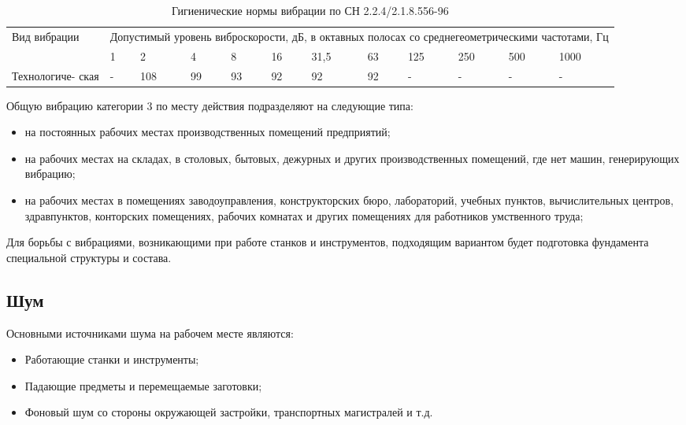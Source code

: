 \begin{table}[!h]
	\begin{center}
		\caption{Гигиенические нормы вибрации по СН 2.2.4/2.1.8.556-96}
		\begin{tabular}{|p{30mm}|
			p{7mm}|
			p{7mm}|
			p{7mm}|
			p{7mm}|
			p{7mm}|
			p{7mm}|
			p{7mm}|
			p{7mm}|
			p{7mm}|
			p{7mm}|
			p{10mm}|
		}
	\hline
	Вид вибрации & \multicolumn{11}{|p{110mm}|}{Допустимый уровень виброскорости, дБ, в октавных полосах со среднегеометрическими частотами, Гц} \\ 
	\cline {2-12}
	& 1 & 2 & 4 & 8 & 16 & 31,5 & 63 & 125 & 250 & 500 & 1000 \\
	\hline
	Технологиче- ская & - & 108 & 99 & 93 & 92 & 92 & 92 & - & - & - & - \\
	\hline
		\end{tabular}
		\label{tab:eco_vibro}
	\end{center}
\end{table}

Общую вибрацию категории 3 по месту действия подразделяют на следующие типа:
\begin{itemize}
	\item на постоянных рабочих местах производственных помещений предприятий;
	\item на рабочих местах на складах, в столовых, бытовых, дежурных и других производственных помещений, где нет машин, генерирующих вибрацию;
	\item на рабочих местах в помещениях заводоуправления, конструкторских бюро, лабораторий, учебных пунктов, вычислительных центров, здравпунктов, конторских помещениях, рабочих комнатах и других помещениях для работников умственного труда;
\end{itemize}

Для борьбы с вибрациями, возникающими при работе станков и инструментов, подходящим вариантом будет подготовка фундамента специальной структуры и состава.

\subsection{Шум}
Основными источниками шума на рабочем месте являются:
\begin{itemize}
	\item Работающие станки и инструменты;
	\item Падающие предметы и перемещаемые заготовки;
	\item Фоновый шум со стороны окружающей застройки, транспортных магистралей и т.д.
\end{itemize}


